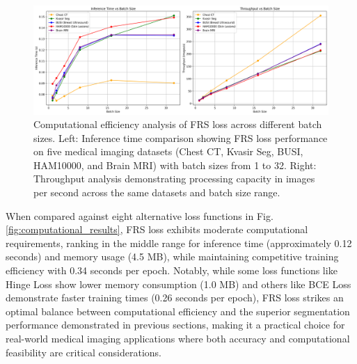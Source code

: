 \documentclass[review]{elsarticle}
\begin{document}
\begin{figure}[t]
	\centering
	\includegraphics[width=\linewidth]{combined_computational_analysis.png}
	\caption{Computational efficiency analysis of FRS loss across different batch sizes. Left: Inference time comparison showing FRS loss performance on five medical imaging datasets (Chest CT, Kvasir Seg, BUSI, HAM10000, and Brain MRI) with batch sizes from 1 to 32. Right: Throughput analysis demonstrating processing capacity in images per second across the same datasets and batch size range.}
    \label{fig:combined_computational}
\end{figure}

When compared against eight alternative loss functions in Fig. \ref{fig:computational_results}, FRS loss exhibits moderate computational requirements, ranking in the middle range for inference time (approximately 0.12 seconds) and memory usage (4.5 MB), while maintaining competitive training efficiency with 0.34 seconds per epoch. Notably, while some loss functions like Hinge Loss show lower memory consumption (1.0 MB) and others like BCE Loss demonstrate faster training times (0.26 seconds per epoch), FRS loss strikes an optimal balance between computational efficiency and the superior segmentation performance demonstrated in previous sections, making it a practical choice for real-world medical imaging applications where both accuracy and computational feasibility are critical considerations.
\end{document}
